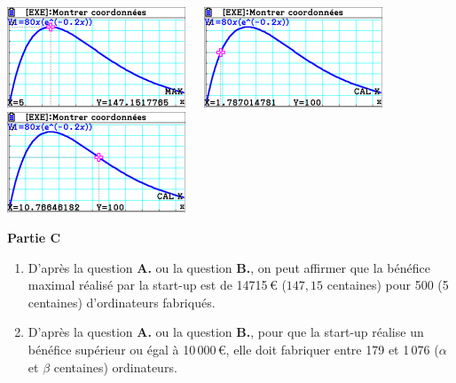\documentclass[a4paper,11pt]{article}
\begin{document}
\begin{pointcalc}
	\hfill\includegraphics[height=3cm]{td08_corr_a}~~~\includegraphics[height=3cm]{td08_corr_b}~~~\includegraphics[height=3cm]{td08_corr_c}\hfill~
\end{pointcalc}

\textbf{\large Partie C}
%
\begin{enumerate}
	\item D'après la question \textbf{A.} ou la question \textbf{B.}, on peut affirmer que la bénéfice maximal réalisé par la start-up est de \num{14715}\,€ ($147,15$ centaines) pour 500 (5 centaines) d'ordinateurs fabriqués.
	\item D'après la question \textbf{A.} ou la question \textbf{B.}, pour que la start-up réalise un bénéfice supérieur ou égal à 10\,000\,€, elle doit fabriquer entre 179 et 1\,076 ($\alpha$ et $\beta$ centaines) ordinateurs.
\end{enumerate}
\end{document}
